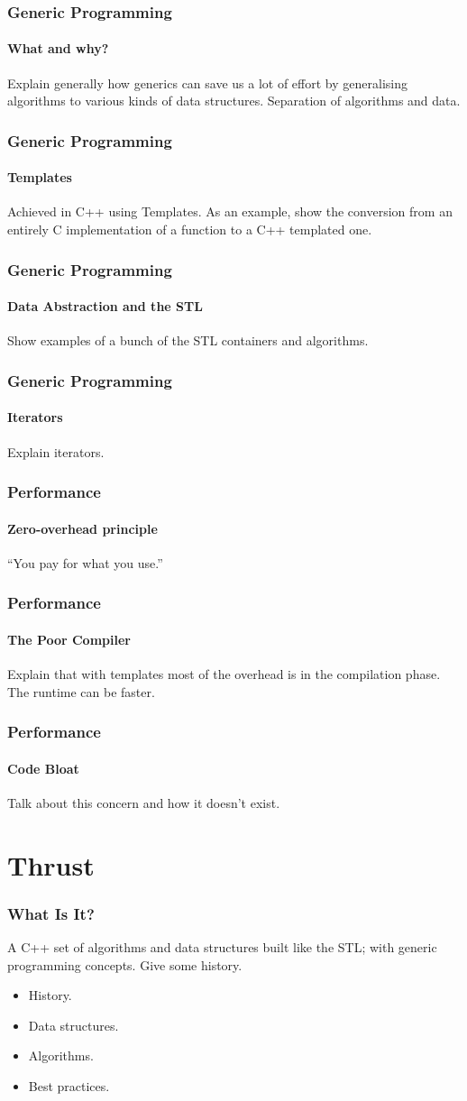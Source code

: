 \documentclass{beamer}
\begin{document}
\begin{frame}
  \frametitle{Generic Programming}
  \framesubtitle{What and why?}
  Explain generally how generics can save us a lot
  of effort by generalising algorithms to various kinds
  of data structures. Separation of algorithms and data.
\end{frame}

\begin{frame}
  \frametitle{Generic Programming}
  \framesubtitle{Templates}
  Achieved in C++ using Templates.
  As an example, show the conversion from an entirely C
  implementation of a function to a C++ templated one.
\end{frame}

\begin{frame}
  \frametitle{Generic Programming}
  \framesubtitle{Data Abstraction and the STL}
  Show examples of a bunch of the STL containers and 
  algorithms.
\end{frame}

\begin{frame}
  \frametitle{Generic Programming}
  \framesubtitle{Iterators}
  Explain iterators.
\end{frame}

\begin{frame}
  \frametitle{Performance}
  \framesubtitle{Zero-overhead principle}
  {\Huge ``You pay for what you use.''}
\end{frame}

\begin{frame}
  \frametitle{Performance}
  \framesubtitle{The Poor Compiler}
  Explain that with templates most of the overhead is
  in the compilation phase. The runtime can be faster.
\end{frame}

\begin{frame}
  \frametitle{Performance}
  \framesubtitle{Code Bloat}
  Talk about this concern and how it doesn't exist.
\end{frame}

\section{Thrust}

\begin{frame}
  \frametitle{What Is It?}
  A C++ set of algorithms and data structures built like
  the STL; with generic programming concepts.
  Give some history.
  \begin{itemize}
    \item History.
    \item Data structures.
    \item Algorithms.
    \item Best practices.
  \end{itemize}
\end{frame}
\end{document}
